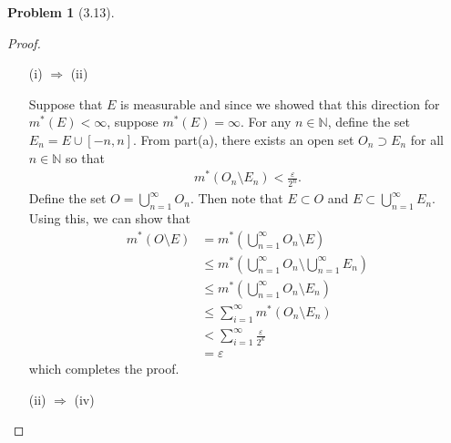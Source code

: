 \documentclass[12pt]{article}
\newcommand{\N}{\mathbb{N}}
\renewcommand{\epsilon}{\varepsilon}
\theoremstyle{definition}
\newtheorem{problem}{Problem}
\begin{document}
\begin{problem}[3.13]
\begin{enumerate}[label = \alph{*}.]
\begin{proof}
                \begin{enumerate}
                    \item[(i) \( \Rightarrow  \) (ii)] 
                    
                        Suppose that \( E \) is measurable and since we showed that this direction for \( m^{*}(E) < \infty \), suppose \( m^{*}(E) = \infty \).
                        For any \( n \in \N \), define the set \( E_n = E \cup [-n, n] \). From part(a), there exists an open set \( O_n \supset E_n \) for all \( n \in \N \) so that 
                            \begin{align*}
                                m^{*}(O_n \setminus E_n) < \frac{\epsilon}{2^{n}}.
                            \end{align*}
                        Define the set \( \displaystyle O = \bigcup_{n=1}^{\infty} O_n \). Then note that \( E \subset O \) and \( \displaystyle E \subset \bigcup_{n=1}^{\infty} E_n \). Using this, we can show that 
                            \begin{align*}
                                m^{*}(O \setminus E) &= m^{*} \left( \bigcup_{n=1}^{\infty} O_n \setminus E \right) \\
                                &\leq m^{*} \left( \bigcup_{n=1}^{\infty} O_n \setminus \bigcup_{n=1}^{\infty} E_n \right) \\
                                &\leq m^{*} \left( \bigcup_{n=1}^{\infty} O_n \setminus E_n \right) \\
                                &\leq \sum_{i=1}^{\infty} m^{*}(O_n \setminus E_n) \\
                                &< \sum_{i=1}^{\infty} \frac{\epsilon}{2^{k}} \\
                                &= \epsilon
                            \end{align*}
                        which completes the proof. 

                    \item[(ii) \( \Rightarrow \) (iv)] 
                    

\end{enumerate}
\end{proof}
\end{enumerate}
\end{problem}
\end{document}
